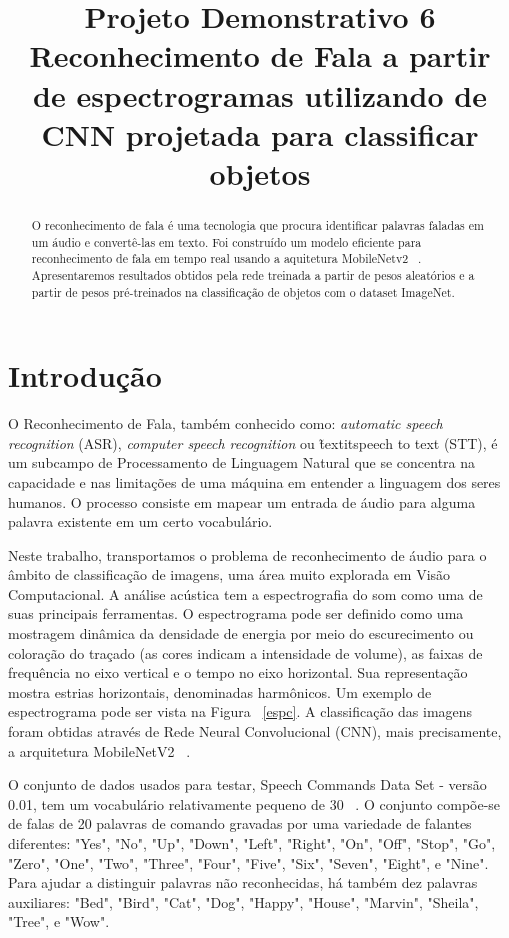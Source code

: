\documentclass{bmvc2k}
\title{Projeto Demonstrativo 6\\ Reconhecimento de Fala a partir de espectrogramas utilizando de CNN projetada para classificar objetos}
\begin{document}
\maketitle

\begin{abstract}

O reconhecimento de fala é uma tecnologia que procura identificar palavras faladas em um áudio e convertê-las em texto. Foi construído um modelo eficiente para reconhecimento de fala em tempo real usando a aquitetura MobileNetv2 ~\cite{mobilenets}. Apresentaremos resultados obtidos pela rede treinada a partir de pesos aleatórios e a partir de pesos pré-treinados na classificação de objetos com o dataset ImageNet.

\end{abstract}

\section{Introdução}
\label{sec:intro}

O Reconhecimento de Fala, também conhecido como: \textit{automatic speech recognition} (ASR), \textit{computer speech recognition} ou \~textit{speech to text} (STT), é um subcampo de Processamento de Linguagem Natural que se concentra na capacidade e nas limitações de uma máquina em entender a linguagem dos seres humanos. O processo consiste em mapear um entrada de áudio para alguma palavra existente em um certo vocabulário. 

Neste trabalho, transportamos o problema de reconhecimento de áudio para o âmbito de classificação de imagens, uma área muito explorada em Visão Computacional. A análise acústica tem a espectrografia do som como uma de suas principais ferramentas. O espectrograma pode ser definido como uma mostragem dinâmica da densidade de energia por meio do escurecimento ou coloração do traçado (as cores indicam a intensidade de volume), as faixas de frequência no eixo vertical e o tempo no eixo horizontal. Sua representação mostra estrias horizontais, denominadas harmônicos. Um exemplo de espectrograma pode ser vista na Figura ~\ref{espc}. A classificação das imagens foram obtidas através de Rede Neural Convolucional (CNN), mais precisamente, a arquitetura MobileNetV2 ~\cite{mobilenets}.

O conjunto de dados usados para testar, Speech Commands Data Set - versão 0.01, tem um vocabulário relativamente pequeno de 30 ~\cite{speechcommandsv2}. O conjunto compõe-se de falas de 20 palavras de comando gravadas por uma variedade de falantes diferentes:  "Yes", "No", "Up", "Down", "Left", "Right", "On", "Off", "Stop", "Go", "Zero", "One", "Two", "Three", "Four", "Five", "Six", "Seven", "Eight", e "Nine". Para ajudar a distinguir palavras não reconhecidas, há também dez palavras auxiliares:  "Bed", "Bird", "Cat", "Dog", "Happy", "House", "Marvin", "Sheila", "Tree", e "Wow".
\end{document}
